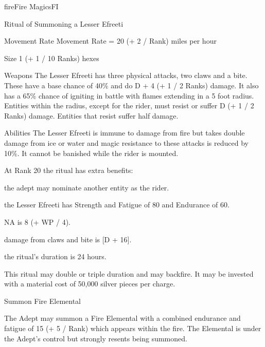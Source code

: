 \begin{college}[2.0]{fire}{Fire Magics}{FI}
\begin{ritual}[R-3]{Ritual of Summoning a Lesser Efreeti}
\begin{effects}
\begin{Description}
\item[Movement Rate] Movement Rate = 20 (+ 2 / Rank) miles per hour

\item[Size] 1 (+ 1 / 10 Ranks) hexes

\item[Weapons] The Lesser Efreeti has three physical attacks, two
claws and a bite. These have a base chance of 40\% and do D + 4 (+ 1 /
2 Ranks) damage.  It also has a 65\% chance of igniting in battle with
flames extending in a 5 foot radius.  Entities within the radius,
except for the rider, must resist or suffer D (+ 1 / 2 Ranks) damage.
Entities that resist suffer half damage.

\item[Abilities] The Lesser Efreeti is immune to damage from fire but
takes double damage from ice or water and magic resistance to these
attacks is reduced by 10\%. It cannot be banished while the rider is
mounted.
\end{Description}

At Rank 20 the ritual has extra benefits:
\begin{Itemize}
\item the adept may nominate another entity as the rider.

\item the Lesser Efreeti has Strength and Fatigue of 80 and Endurance
of 60.

\item NA is 8 (+ WP / 4).

\item damage from claws and bite is [D + 16].

\item the ritual's duration is 24 hours.
\end{Itemize}

This ritual may double or triple duration and may backfire. It may be
invested with a material cost of 50,000 silver pieces per charge.
\end{effects}
\end{ritual}

\begin{ritual}[R-4]{Summon Fire Elemental}
\begin{effects}
The Adept may summon a Fire Elemental with a combined endurance and
fatigue of 15 (+ 5 / Rank) which appears within the fire. The
Elemental is under the Adept's control but strongly resents being
summoned.


\end{effects}
\end{ritual}
\end{college}
